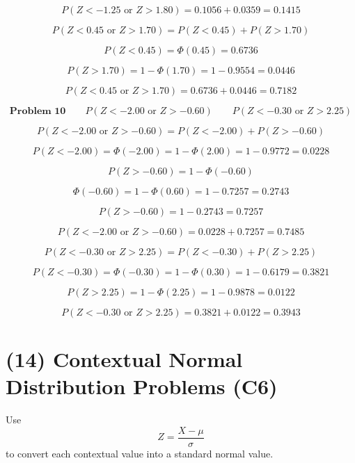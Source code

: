 	\[
	P(Z<-1.25\text{ or }Z>1.80)=0.1056+0.0359=0.1415
	\]
	
	\[
	P(Z<0.45\text{ or }Z>1.70)=P(Z<0.45)+P(Z>1.70)
	\]
	
	\[
	P(Z<0.45)=\Phi(0.45)=0.6736
	\]
	
	\[
	P(Z>1.70)=1-\Phi(1.70)=1-0.9554=0.0446
	\]
	
	\[
	P(Z<0.45\text{ or }Z>1.70)=0.6736+0.0446=0.7182
	\]
	
	\[
	\textbf{Problem 10}
	\qquad
	P(Z<-2.00\text{ or }Z>-0.60)
	\qquad
	P(Z<-0.30\text{ or }Z>2.25)
	\]
	
	\[
	P(Z<-2.00\text{ or }Z>-0.60)=P(Z<-2.00)+P(Z>-0.60)
	\]
	
	\[
	P(Z<-2.00)=\Phi(-2.00)=1-\Phi(2.00)=1-0.9772=0.0228
	\]
	
	\[
	P(Z>-0.60)=1-\Phi(-0.60)
	\]
	
	\[
	\Phi(-0.60)=1-\Phi(0.60)=1-0.7257=0.2743
	\]
	
	\[
	P(Z>-0.60)=1-0.2743=0.7257
	\]
	
	\[
	P(Z<-2.00\text{ or }Z>-0.60)=0.0228+0.7257=0.7485
	\]
	
	\[
	P(Z<-0.30\text{ or }Z>2.25)=P(Z<-0.30)+P(Z>2.25)
	\]
	
	\[
	P(Z<-0.30)=\Phi(-0.30)=1-\Phi(0.30)=1-0.6179=0.3821
	\]
	
	\[
	P(Z>2.25)=1-\Phi(2.25)=1-0.9878=0.0122
	\]
	
	\[
	P(Z<-0.30\text{ or }Z>2.25)=0.3821+0.0122=0.3943
	\]
	
	
	\section{(14) Contextual Normal Distribution Problems (C6)}
	\label{sec:contextual-normal-distribution-problems-c6}
	
	Use
	\[
	Z=\frac{X-\mu}{\sigma}
	\]
	to convert each contextual value into a standard normal value.
	
